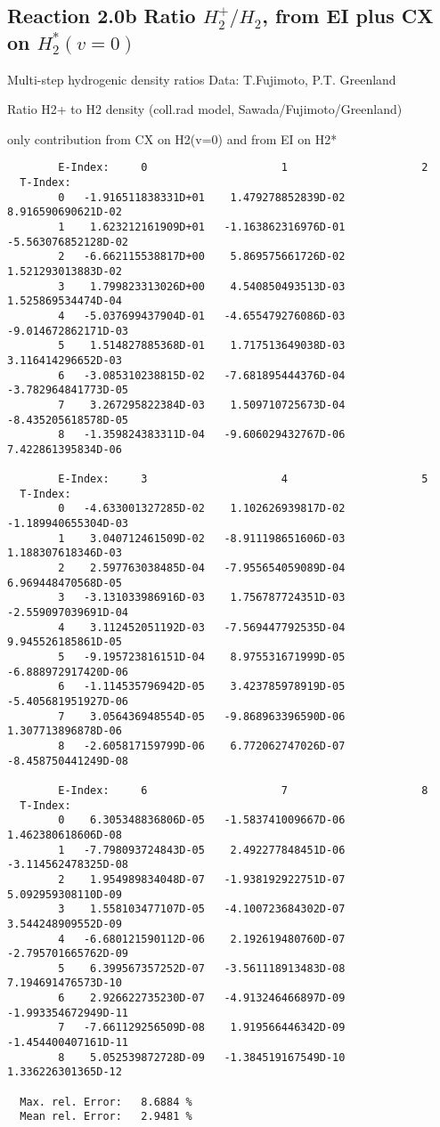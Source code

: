 \subsection{
Reaction 2.0b Ratio $H_2^+/H_2$, from EI plus CX on $H_2^*(v=0)$
}

 Multi-step hydrogenic density ratios
 Data: T.Fujimoto, P.T. Greenland


  Ratio H2+ to H2 density
  (coll.rad model, Sawada/Fujimoto/Greenland)

  only contribution from  CX on H2(v=0) and from EI on H2*


\begin{verbatim}
        E-Index:     0                     1                     2
  T-Index:
        0   -1.916511838331D+01    1.479278852839D-02    8.916590690621D-02
        1    1.623212161909D+01   -1.163862316976D-01   -5.563076852128D-02
        2   -6.662115538817D+00    5.869575661726D-02    1.521293013883D-02
        3    1.799823313026D+00    4.540850493513D-03    1.525869534474D-04
        4   -5.037699437904D-01   -4.655479276086D-03   -9.014672862171D-03
        5    1.514827885368D-01    1.717513649038D-03    3.116414296652D-03
        6   -3.085310238815D-02   -7.681895444376D-04   -3.782964841773D-05
        7    3.267295822384D-03    1.509710725673D-04   -8.435205618578D-05
        8   -1.359824383311D-04   -9.606029432767D-06    7.422861395834D-06

        E-Index:     3                     4                     5
  T-Index:
        0   -4.633001327285D-02    1.102626939817D-02   -1.189940655304D-03
        1    3.040712461509D-02   -8.911198651606D-03    1.188307618346D-03
        2    2.597763038485D-04   -7.955654059089D-04    6.969448470568D-05
        3   -3.131033986916D-03    1.756787724351D-03   -2.559097039691D-04
        4    3.112452051192D-03   -7.569447792535D-04    9.945526185861D-05
        5   -9.195723816151D-04    8.975531671999D-05   -6.888972917420D-06
        6   -1.114535796942D-05    3.423785978919D-05   -5.405681951927D-06
        7    3.056436948554D-05   -9.868963396590D-06    1.307713896878D-06
        8   -2.605817159799D-06    6.772062747026D-07   -8.458750441249D-08

        E-Index:     6                     7                     8
  T-Index:
        0    6.305348836806D-05   -1.583741009667D-06    1.462380618606D-08
        1   -7.798093724843D-05    2.492277848451D-06   -3.114562478325D-08
        2    1.954989834048D-07   -1.938192922751D-07    5.092959308110D-09
        3    1.558103477107D-05   -4.100723684302D-07    3.544248909552D-09
        4   -6.680121590112D-06    2.192619480760D-07   -2.795701665762D-09
        5    6.399567357252D-07   -3.561118913483D-08    7.194691476573D-10
        6    2.926622735230D-07   -4.913246466897D-09   -1.993354672949D-11
        7   -7.661129256509D-08    1.919566446342D-09   -1.454400407161D-11
        8    5.052539872728D-09   -1.384519167549D-10    1.336226301365D-12

  Max. rel. Error:   8.6884 %
  Mean rel. Error:   2.9481 %
\end{verbatim}
